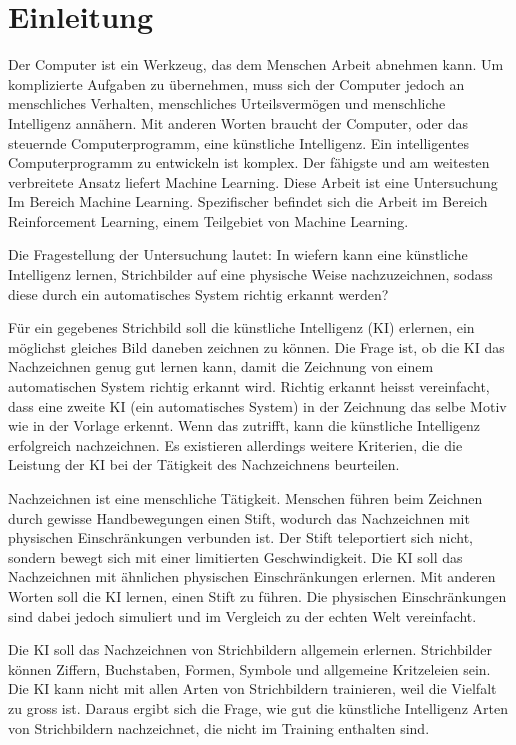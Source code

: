 \chapter{Einleitung}\label{chap:einleit}
Der Computer ist ein Werkzeug, das dem Menschen Arbeit abnehmen kann. Um
komplizierte Aufgaben zu übernehmen, muss sich der Computer jedoch an
menschliches Verhalten, menschliches Urteilsvermögen und menschliche Intelligenz
annähern. Mit anderen Worten braucht der Computer, oder das steuernde
Computerprogramm, eine künstliche Intelligenz. Ein intelligentes
Computerprogramm zu entwickeln ist komplex. Der fähigste und am weitesten
verbreitete Ansatz liefert Machine Learning. Diese Arbeit ist eine Untersuchung
Im Bereich Machine Learning. Spezifischer befindet sich die Arbeit im Bereich
Reinforcement Learning, einem Teilgebiet von Machine Learning.

Die Fragestellung der Untersuchung lautet: In wiefern kann eine künstliche
Intelligenz lernen, Strichbilder auf eine physische Weise nachzuzeichnen, sodass
diese durch ein automatisches System richtig erkannt werden?

Für ein gegebenes Strichbild soll die künstliche Intelligenz (KI) erlernen, ein
möglichst gleiches Bild daneben zeichnen zu können. Die Frage ist, ob die KI das
Nachzeichnen genug gut lernen kann, damit die Zeichnung von einem automatischen
System richtig erkannt wird. Richtig erkannt heisst vereinfacht,
dass eine zweite KI (ein automatisches System) in der Zeichnung das selbe Motiv wie in der Vorlage erkennt.
Wenn das zutrifft, kann die künstliche Intelligenz erfolgreich nachzeichnen. Es
existieren allerdings weitere Kriterien, die die Leistung der KI bei der
Tätigkeit des Nachzeichnens beurteilen.

Nachzeichnen ist eine menschliche Tätigkeit. Menschen führen beim Zeichnen durch
gewisse Handbewegungen einen Stift, wodurch das Nachzeichnen mit physischen
Einschränkungen verbunden ist. Der Stift teleportiert sich nicht, sondern bewegt
sich mit einer limitierten Geschwindigkeit. Die KI soll das Nachzeichnen mit
ähnlichen physischen Einschränkungen erlernen. Mit anderen Worten soll die KI
lernen, einen Stift zu führen. Die physischen Einschränkungen sind dabei jedoch
simuliert und im Vergleich zu der echten Welt vereinfacht. 

Die KI soll das Nachzeichnen von Strichbildern allgemein erlernen. Strichbilder
können Ziffern, Buchstaben, Formen, Symbole und allgemeine Kritzeleien sein. Die
KI kann nicht mit allen Arten von Strichbildern trainieren, weil die Vielfalt zu
gross ist. Daraus ergibt sich die Frage, wie gut die künstliche Intelligenz
Arten von Strichbildern nachzeichnet, die nicht im Training enthalten sind.

